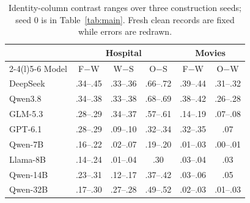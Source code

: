 \begin{table}[t]
  \caption{Identity-column contrast ranges over three construction seeds; seed 0 is in
  Table~\ref{tab:main}. Fresh clean records are fixed while errors are redrawn.}
  \label{tab:seeds}
  \small
  \setlength{\tabcolsep}{2.5pt}
  \begin{tabular*}{\columnwidth}{@{\extracolsep{\fill}}l ccc cc@{}}
    \toprule
    & \multicolumn{3}{c}{Hospital} & \multicolumn{2}{c}{Movies} \\
    \cmidrule(lr){2-4}\cmidrule(l){5-6}
    Model & F$-$W & W$-$S & O$-$S & F$-$W & O$-$W \\
    \midrule
    DeepSeek & .34--.45 & .33--.36 & .66--.72 & .39--.44 & .31--.32 \\
    Qwen3.8 & .34--.38 & .33--.38 & .68--.69 & .38--.42 & .26--.28 \\
    GLM-5.3 & .28--.29 & .34--.37 & .57--.61 & .14--.19 & .07--.08 \\
    GPT-6.1 & .28--.29 & .09--.10 & .32--.34 & .32--.35 & .07 \\
    \midrule
    Qwen-7B & .16--.22 & .02--.07 & .19--.20 & .01--.03 & .00--.01 \\
    Llama-8B & .14--.24 & .01--.04 & .30 & .03--.04 & .03 \\
    Qwen-14B & .23--.31 & .12--.17 & .37--.42 & .03--.06 & .05 \\
    Qwen-32B & .17--.30 & .27--.28 & .49--.52 & .02--.03 & .01--.03 \\
    \bottomrule
  \end{tabular*}
\end{table}
